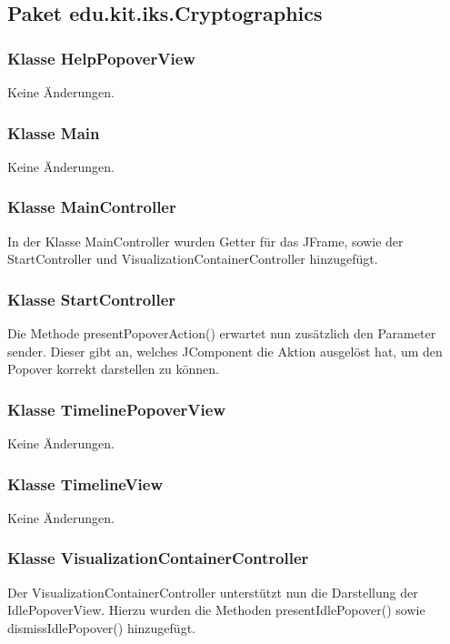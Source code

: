 \documentclass{article}
\begin{document}
  \subsection{Paket edu.kit.iks.Cryptographics}
    \subsubsection{Klasse HelpPopoverView}
      Keine Änderungen.

    \subsubsection{Klasse Main}
      Keine Änderungen.

    \subsubsection{Klasse MainController}
      In der Klasse MainController wurden Getter für das JFrame, sowie der StartController
      und VisualizationContainerController hinzugefügt.

    \subsubsection{Klasse StartController}
      Die Methode presentPopoverAction() erwartet nun zusätzlich den Parameter sender. Dieser gibt an, welches
      JComponent die Aktion ausgelöst hat, um den Popover korrekt darstellen zu können.

    \subsubsection{Klasse TimelinePopoverView}
      Keine Änderungen.

    \subsubsection{Klasse TimelineView}
      Keine Änderungen.

    \subsubsection{Klasse VisualizationContainerController}
      Der VisualizationContainerController unterstützt nun die Darstellung der IdlePopoverView. Hierzu wurden
      die Methoden presentIdlePopover() sowie dismissIdlePopover() hinzugefügt.\newline
\end{document}
